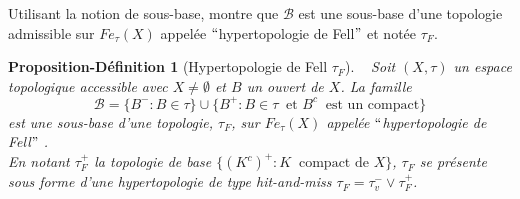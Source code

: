 \documentclass[11pt]{report}
\newenvironment{boxdefinition}
{\begin{tcolorbox}
		[enhanced jigsaw,breakable,pad at break*=1mm,
		colback=black!5!white,boxrule=0pt,frame hidden,
		borderline west={1.5mm}{-2mm}{blue}]}
	{\end{tcolorbox}}
\theoremstyle{styletheorem}
\theoremstyle{styledef}
\newtheorem{propozition}[theoreme]{Proposition-Définition}
\theoremstyle{remark}
\newenvironment{propdf}{\vspace*{0.3cm}\begin{boxdefinition}\begin{propozition}}{\end{propozition}\end{boxdefinition}\vspace*{0.3cm}}
\begin{document}
Utilisant la notion de sous-base, \cite{b7} montre que  $\mathcal{B}$ est une sous-base d'une topologie admissible sur $Fe_\tau (X)$ appelée $``$hypertopologie de Fell$"$ et notée $\tau_F$.

\begin{propdf}[Hypertopologie de Fell $\tau_F$\label{122}] \ \newline
	Soit $(X,\tau)$ un espace topologique accessible avec $X \neq \emptyset$ et $B$ un  ouvert de $X$. La famille $$\mathcal{B} = \lbrace B^- : B \in \tau \rbrace \cup \lbrace B^+ : B \in \tau\ \text{ et }  B^c\ \text{ est un compact} \rbrace $$ est une sous-base d'une topologie, $\tau_{F}$, sur $Fe_\tau (X)$ appelée $``$hypertopologie de Fell$"$ \cite{b7}.\\
	En notant  $\tau_F^+$ la topologie de base $ \lbrace (K^c)^+\colon K\ \text{ compact de } X \rbrace $, $\tau_F$ se présente sous forme d'une hypertopologie de type \textit{hit-and-miss} $\tau_F = \tau_v^- \vee \tau_F^+$.
\end{propdf}
\end{document}
